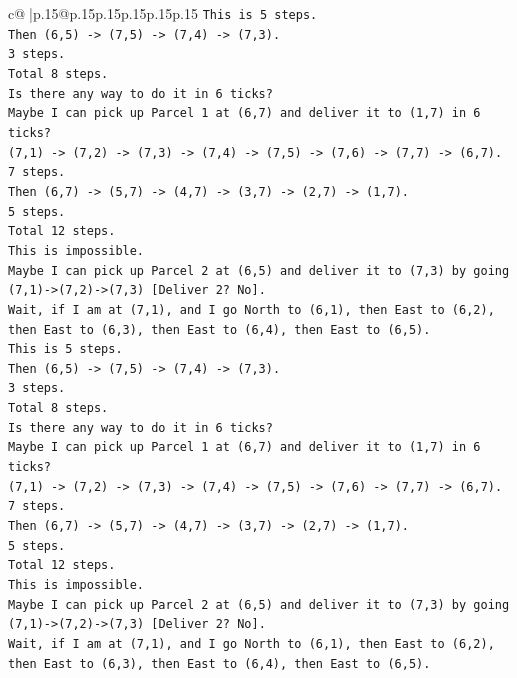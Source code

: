 \documentclass{article}
\begin{document}
{\begin{supertabular}{c@{$\;$}|p{.15\linewidth}@{}p{.15\linewidth}p{.15\linewidth}p{.15\linewidth}p{.15\linewidth}p{.15\linewidth}}
{{{\texttt{This is 5 steps.} \\
\texttt{Then (6,5) {-}> (7,5) {-}> (7,4) {-}> (7,3).} \\
\texttt{3 steps.} \\
\texttt{Total 8 steps.} \\
\texttt{Is there any way to do it in 6 ticks?} \\
\texttt{Maybe I can pick up Parcel 1 at (6,7) and deliver it to (1,7) in 6 ticks?} \\
\texttt{(7,1) {-}> (7,2) {-}> (7,3) {-}> (7,4) {-}> (7,5) {-}> (7,6) {-}> (7,7) {-}> (6,7).} \\
\texttt{7 steps.} \\
\texttt{Then (6,7) {-}> (5,7) {-}> (4,7) {-}> (3,7) {-}> (2,7) {-}> (1,7).} \\
\texttt{5 steps.} \\
\texttt{Total 12 steps.} \\
\texttt{This is impossible.} \\
\texttt{Maybe I can pick up Parcel 2 at (6,5) and deliver it to (7,3) by going (7,1){-}>(7,2){-}>(7,3) {[}Deliver 2? No{]}.} \\
\texttt{Wait, if I am at (7,1), and I go North to (6,1), then East to (6,2), then East to (6,3), then East to (6,4), then East to (6,5).} \\
\texttt{This is 5 steps.} \\
\texttt{Then (6,5) {-}> (7,5) {-}> (7,4) {-}> (7,3).} \\
\texttt{3 steps.} \\
\texttt{Total 8 steps.} \\
\texttt{Is there any way to do it in 6 ticks?} \\
\texttt{Maybe I can pick up Parcel 1 at (6,7) and deliver it to (1,7) in 6 ticks?} \\
\texttt{(7,1) {-}> (7,2) {-}> (7,3) {-}> (7,4) {-}> (7,5) {-}> (7,6) {-}> (7,7) {-}> (6,7).} \\
\texttt{7 steps.} \\
\texttt{Then (6,7) {-}> (5,7) {-}> (4,7) {-}> (3,7) {-}> (2,7) {-}> (1,7).} \\
\texttt{5 steps.} \\
\texttt{Total 12 steps.} \\
\texttt{This is impossible.} \\
\texttt{Maybe I can pick up Parcel 2 at (6,5) and deliver it to (7,3) by going (7,1){-}>(7,2){-}>(7,3) {[}Deliver 2? No{]}.} \\
\texttt{Wait, if I am at (7,1), and I go North to (6,1), then East to (6,2), then East to (6,3), then East to (6,4), then East to (6,5).} \\
}}}
\end{supertabular}}
\end{document}
